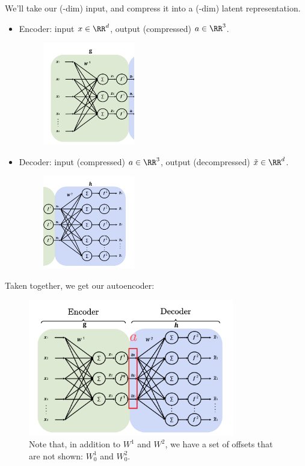         We'll take our (-dim) input, and compress it into a (-dim) latent representation.

        \begin{itemize}
            \item Encoder: input $x \in \RR^d$, output (compressed) $a \in \RR^3$. 

                \begin{figure}[H]
                    \centering
                    \includegraphics[width=40mm,scale=0.5]{images/autoencoder_images/encoder.png}
                \end{figure}
                    
            \item Decoder: input (compressed) $a \in \RR^3$, output (decompressed) $\tilde{x} \in \RR^d$.

                \begin{figure}[H]
                    \centering
                    \includegraphics[width=40mm,scale=0.5]{images/autoencoder_images/decoder.png}
                \end{figure}
        \end{itemize}

        Taken together, we get our autoencoder:

        \begin{figure}[H]
            \centering
            \includegraphics[width=90mm,scale=0.5]{images/autoencoder_images/encoder_decoder.png}

            \caption*{Note that, in addition to $W^1$ and $W^2$, we have a set of offsets that are not shown: $W^1_0$ and $W^2_0$.}
        \end{figure}

